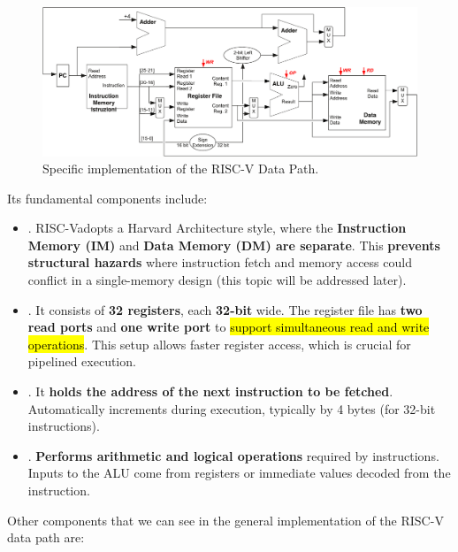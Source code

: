 \begin{figure}[!htp]
    \centering
    \includegraphics[width=\textwidth]{img/detailed-risc-v-dp.pdf}
    \caption{Specific implementation of the RISC-V Data Path.}
\end{figure}

\noindent
Its fundamental components include:
\begin{itemize}
    \item {}. RISC-V\break adopts a Harvard Architecture style, where the \textbf{Instruction Memory (IM)} and \textbf{Data Memory (DM) are separate}. This \textbf{prevents structural hazards} where instruction fetch and memory access could conflict in a single-memory design (this topic will be addressed later).

    \item {}. It consists of \textbf{32 registers}, each \textbf{32-bit} wide. The register file has \textbf{two read ports} and \textbf{one write port} to \hl{support simultaneous read and write operations}. This setup allows faster register access, which is crucial for pipelined execution.

    \item {}. It \textbf{holds the address of the next instruction to be fetched}. Automatically increments during execution, typically by 4 bytes (for 32-bit instructions).
    
    \item {}. \textbf{Performs arithmetic and logical operations} required by instructions. Inputs to the ALU come from registers or immediate values decoded from the instruction.
\end{itemize}
Other components that we can see in the general implementation of the RISC-V data path are:
